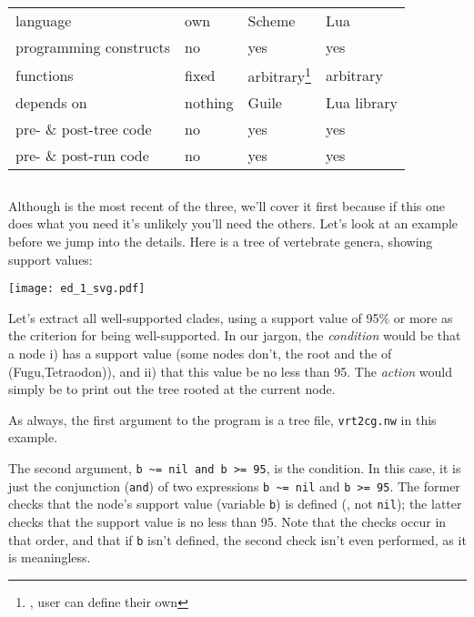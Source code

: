\begin{center}
	\begin{minipage}{0.8\textwidth}
		\begin{tabular}{llll}
		& \ed & \sched & \luaed \\
		\hline
		language & own & Scheme & Lua \\
		programming constructs & no & yes & yes \\
		functions & fixed & arbitrary\footnote{\ie, user can define their own} & arbitrary \\
		depends on & nothing & \gnu{} Guile & Lua library \\
		pre- \& post-tree code & no & yes & yes \\
		pre- \& post-run code & no & yes & yes
		\end{tabular}
	\end{minipage}
\end{center}

\subsection{\luaed}

Although \luaed{} is the most recent of the three, we'll cover it first because
if this one does what you need it's unlikely you'll need the others.  Let's look
at an example before we jump into the details. Here is a tree of vertebrate
genera, showing support values:


\begin{center}
\texttt{[image: ed\_1\_svg.pdf]}
\end{center}

\noindent{}Let's extract all well-supported clades, using a support value of
95\% or more as the criterion for being well-supported. In our jargon, the
\emph{condition} would be that a node i) has a support value (some nodes don't,
\eg{} the root and the \lca{} of (Fugu,Tetraodon)), and ii) that this value be
no less than 95. The \emph{action} would simply be to print out the tree rooted
at the current node.


\begin{samepage}

\end{samepage}

\noindent{}As always, the first argument to the program is a tree file,
\texttt{vrt2cg.nw} in this example.

The second argument, \verb+b ~= nil and b >= 95+, is the condition.  In this
case, it is just the conjunction (\texttt{and}) of two expressions
\verb+b ~= nil+ and \texttt{b >= 95}.  The former checks that the node's support
value (variable \texttt{b}) is defined (\ie, not \texttt{nil}); the latter
checks that the support value is no less than 95. Note that the checks occur in
that order, and that if \texttt{b} isn't defined, the second check isn't even
performed, as it is meaningless.


